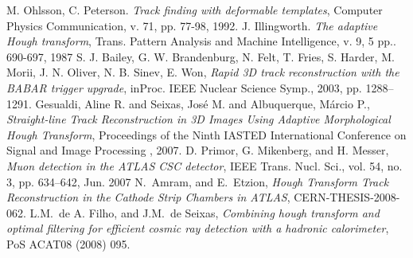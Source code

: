 \documentclass{JINST}
\begin{document}
\begin{thebibliography}{9}
 M. Ohlsson, C. Peterson. 
\emph{Track ﬁnding with deformable templates},
 Computer Physics Communication, v. 71, pp. 77-98, 1992.
%
%
 J. Illingworth. 
\emph{The adaptive Hough transform}, 
Trans. Pattern Analysis and Machine Intelligence, v. 9, 5 pp.. 690-697, 1987
%
%
 S. J. Bailey, G. W. Brandenburg, N. Felt, T. Fries, S. Harder, M. Morii, J. N. Oliver, N. B. Sinev, E. Won,
\emph{Rapid 3D track reconstruction with the BABAR trigger upgrade},
 inProc. IEEE Nuclear Science Symp., 2003, pp. 1288–1291.
%
%
 Gesualdi, Aline R. and Seixas, Jos{\'e} M. and Albuquerque, M\'{a}rcio P.,
\emph{Straight-line Track Reconstruction in 3D Images Using Adaptive Morphological Hough Transform},
 Proceedings of the Ninth IASTED International Conference on Signal and Image Processing , 2007.
%
%
%
%
 D. Primor, G. Mikenberg, and H. Messer,
\emph{Muon detection in the ATLAS CSC detector},
 IEEE Trans. Nucl. Sci., vol. 54, no. 3, pp. 634–642, Jun. 2007
%
%
 N.~Amram, and E.~Etzion,
\emph{Hough Transform Track Reconstruction in the Cathode Strip Chambers in ATLAS},
CERN-THESIS-2008-062.
%
%
 L.M.~de A. Filho, and J.M.~de Seixas,
\emph{Combining hough transform and optimal filtering for efficient cosmic ray detection with a hadronic calorimeter},
PoS ACAT08 (2008) 095.



\end{thebibliography}
\end{document}
